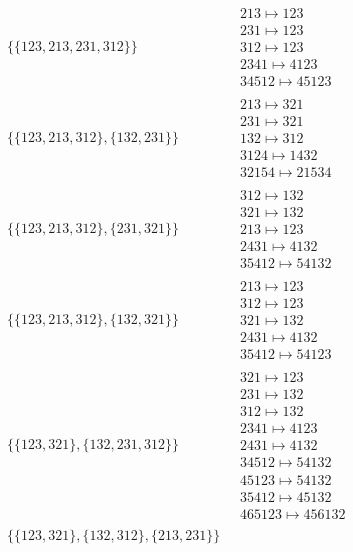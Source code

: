 \begin{scriptsize}
\begin{align}
\begin{matrix}
\end{matrix}
\\
\{\{123, 213, 231, 312\}\}
\ 
&
\begin{matrix}
213 \mapsto 123\\231 \mapsto 123\\312 \mapsto 123\\2341 \mapsto 4123\\34512 \mapsto 45123
\end{matrix}
\\
\{\{123, 213, 312\}, \{132, 231\}\}
\ 
&
\begin{matrix}
213 \mapsto 321\\231 \mapsto 321\\132 \mapsto 312\\3124 \mapsto 1432\\32154 \mapsto 21534
\end{matrix}
\\
\{\{123, 213, 312\}, \{231, 321\}\}
\ 
&
\begin{matrix}
312 \mapsto 132\\321 \mapsto 132\\213 \mapsto 123\\2431 \mapsto 4132\\35412 \mapsto 54132
\end{matrix}
\\
\{\{123, 213, 312\}, \{132, 321\}\}
\ 
&
\begin{matrix}
213 \mapsto 123\\312 \mapsto 123\\321 \mapsto 132\\2431 \mapsto 4132\\35412 \mapsto 54123
\end{matrix}
\\
\{\{123, 321\}, \{132, 231, 312\}\}
\ 
&
\begin{matrix}
321 \mapsto 123\\231 \mapsto 132\\312 \mapsto 132\\2341 \mapsto 4123\\2431 \mapsto 4132\\34512 \mapsto 54132\\45123 \mapsto 54132\\35412 \mapsto 45132\\465123 \mapsto 456132
\end{matrix}
\\
\{\{123, 321\}, \{132, 312\}, \{213, 231\}\}
\ 
&
\begin{matrix}

\end{matrix}
\end{align}
\end{scriptsize}
